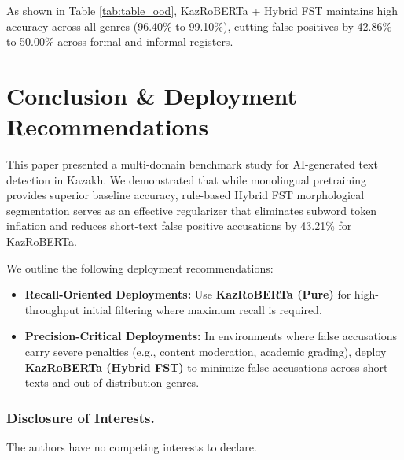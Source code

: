\documentclass[runningheads]{llncs}
\begin{document}
As shown in Table \ref{tab:table_ood}, KazRoBERTa + Hybrid FST maintains high accuracy across all genres (96.40\% to 99.10\%), cutting false positives by 42.86\% to 50.00\% across formal and informal registers.

\section{Conclusion \& Deployment Recommendations}
This paper presented a multi-domain benchmark study for AI-generated text detection in Kazakh. We demonstrated that while monolingual pretraining provides superior baseline accuracy, rule-based Hybrid FST morphological segmentation serves as an effective regularizer that eliminates subword token inflation and reduces short-text false positive accusations by 43.21\% for KazRoBERTa.

We outline the following deployment recommendations:
\begin{itemize}
\item \textbf{Recall-Oriented Deployments:} Use \textbf{KazRoBERTa (Pure)} for high-throughput initial filtering where maximum recall is required.
\item \textbf{Precision-Critical Deployments:} In environments where false accusations carry severe penalties (e.g., content moderation, academic grading), deploy \textbf{KazRoBERTa (Hybrid FST)} to minimize false accusations across short texts and out-of-distribution genres.
\end{itemize}

\subsubsection*{Disclosure of Interests.}
The authors have no competing interests to declare.
\end{document}
